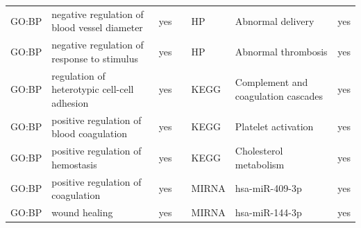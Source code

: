\begin{longtable}{@{}lp{5cm}lllp{5cm}l@{}}
GO:BP           & negative regulation of blood vessel diameter                                                                                       & yes              &           & HP              & Abnormal delivery                                                                                                                                                      & yes              \\
GO:BP           & negative regulation of response to stimulus                                                                                        & yes              &           & HP              & Abnormal thrombosis                                                                                                                                                    & yes              \\
GO:BP           & regulation of heterotypic cell-cell adhesion                                                                                       & yes              &           & KEGG            & Complement and coagulation cascades                                                                                                                                    & yes              \\
GO:BP           & positive regulation of blood coagulation                                                                                           & yes              &           & KEGG            & Platelet activation                                                                                                                                                    & yes              \\
GO:BP           & positive regulation of hemostasis                                                                                                  & yes              &           & KEGG            & Cholesterol metabolism                                                                                                                                                 & yes              \\
GO:BP           & positive regulation of coagulation                                                                                                 & yes              &           & MIRNA           & hsa-miR-409-3p                                                                                                                                                         & yes              \\
GO:BP           & wound healing                                                                                                                      & yes              &           & MIRNA           & hsa-miR-144-3p                                                                                                                                                         & yes              \\

\end{longtable}
